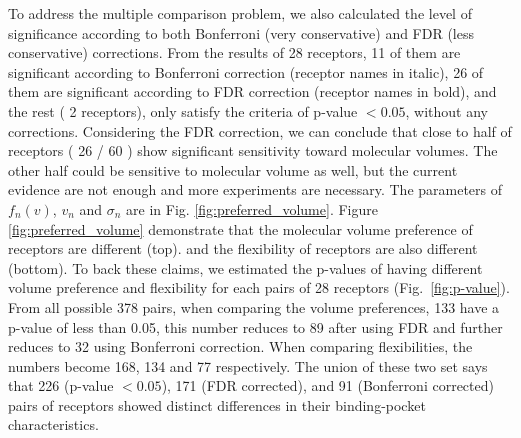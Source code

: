 \documentclass[11pt]{article} %
\newcommand{\numberofreceptors}{ 28 }
\newcommand{\bonferroni}{ 11 }
\newcommand{\fdr}{ 26 }
\newcommand{\nocorrection}{ 2 }
\begin{document}
To address the multiple comparison problem, 
we also calculated the level of significance according to both Bonferroni (very conservative) and FDR (less conservative) corrections. 
From the results of \numberofreceptors receptors, 
\bonferroni of them are significant according to Bonferroni correction (receptor names in italic), 
\fdr of them are significant according to FDR correction 
(receptor names in bold), 
and the rest (\nocorrection receptors), 
only satisfy the criteria of  p-value $<0.05$, without any corrections.
Considering the FDR correction, 
we can conclude that close to half of receptors (\fdr / 60 ) show significant sensitivity toward molecular volumes. 
The other half could be sensitive to molecular volume as well, but the current evidence are not enough and
more experiments are necessary.
The parameters of $f_n(v)$, $v_n$ and $\sigma_n$ are in Fig. \ref{fig:preferred_volume}.
Figure \ref{fig:preferred_volume} demonstrate that the molecular volume preference of receptors are different (top). 
and the flexibility of receptors are also different (bottom).
To back these claims, 
we estimated the p-values of having different volume preference and flexibility for each pairs of \numberofreceptors receptors
(Fig.~\ref{fig:p-value}). 
From all possible 378 pairs, 
when comparing the volume preferences, 
133 have a p-value of less than 0.05, 
this number reduces to 89 after using FDR and further reduces to 32 using Bonferroni correction.
When comparing flexibilities, 
the numbers become 168, 134 and 77 respectively. 
The union of these two set says that 226 (p-value $<0.05$), 171 (FDR corrected), and 91 (Bonferroni corrected) pairs of receptors showed distinct differences in their binding-pocket characteristics.
\end{document}
